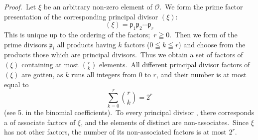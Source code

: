 \documentclass[12pt]{article}
\theoremstyle{definition}
\begin{document}
{\em Proof.}\, Let $\xi$ be an arbitrary non-zero element of $\mathcal{O}$.\, We form the prime factor presentation of the corresponding principal divisor $(\xi)$:
$$(\xi) = \mathfrak{p}_1\mathfrak{p}_2\cdots\mathfrak{p}_r$$
This is unique up to the ordering of the factors;\, $r \geqq 0$.\, Then we form of the prime divisors $\mathfrak{p}_i$ all products having $k$ factors 
($0 \leqq k \leqq r$) and choose from the products those which are principal divisors.\, Thus we obtain a set of factors of $(\xi)$ containing at most $\displaystyle r \choose k$ elements.\, All different principal divisor factors of $(\xi)$ are gotten, as $k$ runs all integers from 0 to $r$, and their number is at most equal to
$$\sum_{k=0}^r{r \choose k} = 2^r$$
(see 5. in the binomial coefficients).\, To every principal divisor , there corresponds a  of associate factors of $\xi$, and the elements of distinct  are non-associates.\, Since $\xi$ has not other factors, the number of its non-associated factors is at most $2^r$.

\end{document}
